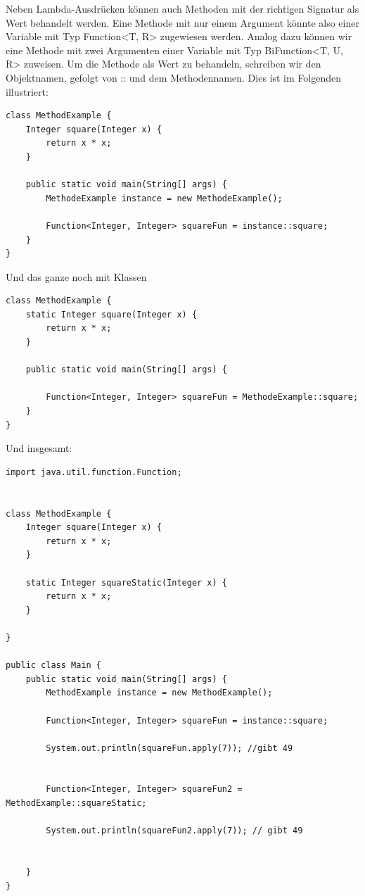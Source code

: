 \documentclass[12pt]{article}
\begin{document}
    Neben Lambda-Ausdrücken können auch Methoden mit der richtigen Signatur als Wert behandelt werden. 
    Eine Methode mit nur einem Argument könnte also einer Variable mit Typ Function<T, R> zugewiesen werden. 
    Analog dazu können wir eine Methode mit zwei Argumenten einer Variable mit Typ BiFunction<T, U, R> zuweisen. 
    Um die Methode als Wert zu behandeln, schreiben wir den Objektnamen, gefolgt von :: und dem Methodennamen. 
    Dies ist im Folgenden illustriert:


    \begin{lstlisting}
class MethodExample {
    Integer square(Integer x) { 
        return x * x;
    }
    
    public static void main(String[] args) {
        MethodeExample instance = new MethodeExample();

        Function<Integer, Integer> squareFun = instance::square;
    }
}
    \end{lstlisting}

    Und das ganze noch mit Klassen

    \begin{lstlisting}
class MethodExample {
    static Integer square(Integer x) { 
        return x * x;
    }
    
    public static void main(String[] args) {        

        Function<Integer, Integer> squareFun = MethodeExample::square;
    }
}
    \end{lstlisting}

    Und insgesamt:

    \begin{lstlisting}
import java.util.function.Function;


class MethodExample {
    Integer square(Integer x) { 
        return x * x;
    }
    
    static Integer squareStatic(Integer x) { 
        return x * x;
    }
    
}

public class Main {
    public static void main(String[] args) {
        MethodExample instance = new MethodExample();

        Function<Integer, Integer> squareFun = instance::square;
        
        System.out.println(squareFun.apply(7)); //gibt 49
        
        
        Function<Integer, Integer> squareFun2 = MethodExample::squareStatic;
        
        System.out.println(squareFun2.apply(7)); // gibt 49


    }
}
    \end{lstlisting}
\end{document}
